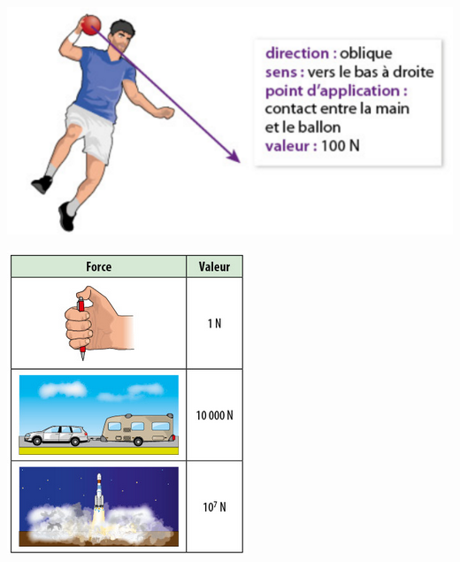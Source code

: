 \documentclass[12pt,a4paper]{article}
\begin{document}
	
\graphicspath{{./img/}}	

\begin{multicols}{2}
	\begin{center}
		\includegraphics[scale=0.6]{ex_force}
	\end{center}
	
	\begin{center}
		\includegraphics[scale=0.6]{og_valeurs}
	\end{center}
\end{multicols}
\end{document}
